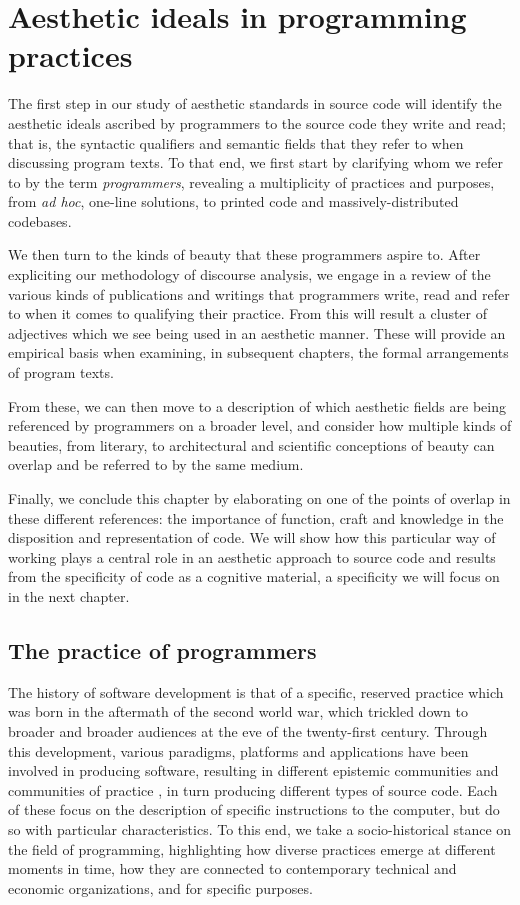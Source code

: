 \chapter{Aesthetic ideals in programming practices}
\label{chap:ideals}

The first step in our study of aesthetic standards in source code will identify the aesthetic ideals ascribed by programmers to the source code they write and read; that is, the syntactic qualifiers and semantic fields that they refer to when discussing program texts. To that end, we first start by clarifying whom we refer to by the term \emph{programmers}, revealing a multiplicity of practices and purposes, from \emph{ad hoc}, one-line solutions, to printed code and massively-distributed codebases.

We then turn to the kinds of beauty that these programmers aspire to. After expliciting our methodology of discourse analysis, we engage in a review of the various kinds of publications and writings that programmers write, read and refer to when it comes to qualifying their practice. From this will result a cluster of adjectives which we see being used in an aesthetic manner. These will provide an empirical basis when examining, in subsequent chapters, the formal arrangements of program texts.

From these, we can then move to a description of which aesthetic fields are being referenced by programmers on a broader level, and consider how multiple kinds of beauties, from literary, to architectural and scientific conceptions of beauty can overlap and be referred to by the same medium.

Finally, we conclude this chapter by elaborating on one of the points of overlap in these different references: the importance of function, craft and knowledge in the disposition and representation of code. We will show how this particular way of working  plays a central role in an aesthetic approach to source code and results from the specificity of code as a cognitive material, a specificity we will focus on in the next chapter.

\pagebreak

\section{The practice of programmers}

The history of software development is that of a specific, reserved practice which was born in the aftermath of the second world war, which trickled down to broader and broader audiences at the eve of the twenty-first century. Through this development, various paradigms, platforms and applications have been involved in producing software, resulting in different epistemic communities and communities of practice \citep{cohendet_organisational_2001}, in turn producing different types of source code. Each of these focus on the description of specific instructions to the computer, but do so with particular characteristics. To this end, we take a socio-historical stance on the field of programming, highlighting how diverse practices emerge at different moments in time, how they are connected to contemporary technical and economic organizations, and for specific purposes.

